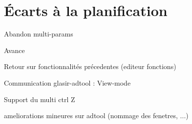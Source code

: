 \section{Écarts à la planification}
\label{sec:ecarts}


Abandon multi-params

Avance

Retour sur fonctionnalités précedentes (editeur fonctions)

Communication glasir-adtool : View-mode

Support du multi ctrl Z

ameliorations mineures sur adtool (nommage des fenetres, ...)